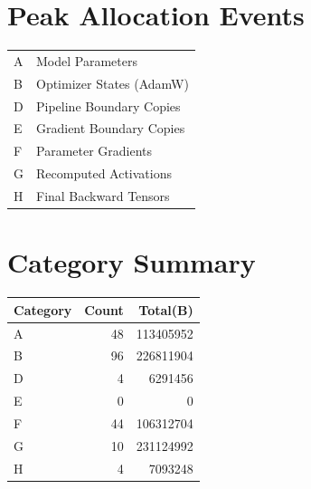 \documentclass{article}
\begin{document}
\section*{Peak Allocation Events}
\small
\begin{tabular}{ll}
A & Model Parameters \\
B & Optimizer States (AdamW) \\
D & Pipeline Boundary Copies \\
E & Gradient Boundary Copies \\
F & Parameter Gradients \\
G & Recomputed Activations \\
H & Final Backward Tensors \\
\end{tabular}
\vspace{0.5em}
\section*{Category Summary}
\begin{tabular}{l r r}
Category & Count & Total(B) \\
\hline
A & 48 & 113405952 \\
B & 96 & 226811904 \\
D & 4 & 6291456 \\
E & 0 & 0 \\
F & 44 & 106312704 \\
G & 10 & 231124992 \\
H & 4 & 7093248 \\
\end{tabular}
\vspace{0.5em}
\end{document}
